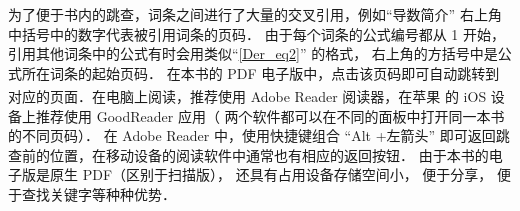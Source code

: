 为了便于书内的跳查，词条之间进行了大量的交叉引用，例如“导数简介” 右上角中括号中的数字代表被引用词条的页码． 由于每个词条的公式编号都从 1 开始， 引用其他词条中的公式有时会用类似“\autoref{Der_eq2}” 的格式， 右上角的方括号中是公式所在词条的起始页码． 在本书的 PDF 电子版中，点击该页码即可自动跳转到对应的页面．在电脑上阅读，推荐使用 Adobe Reader 阅读器，在苹果\textsuperscript{\textregistered} 的 iOS 设备上推荐使用 GoodReader 应用（ 两个软件都可以在不同的面板中打开同一本书的不同页码）． 在 Adobe Reader 中，使用快捷键组合 “Alt +左箭头” 即可返回跳查前的位置，在移动设备的阅读软件中通常也有相应的返回按钮． 由于本书的电子版是原生 PDF（区别于扫描版）， 还具有占用设备存储空间小， 便于分享， 便于查找关键字等种种优势．




